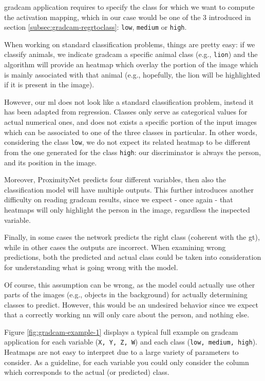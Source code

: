 \gls{gradcam} application requires to specify the class for which we want to compute the activation mapping, which in our case would be one of the 3 introduced in section \ref{subsec:gradcam-regrtoclass}: \texttt{low}, \texttt{medium} or \texttt{high}. 

When working on standard classification problems, things are pretty easy: if we classify animals, we indicate \gls{gradcam} a specific animal class (e.g., \texttt{lion}) and the algorithm will provide an heatmap which overlay the portion of the image which is mainly associated with that animal (e.g., hopefully, the lion will be highlighted if it is present in the image).

\medskip

However, our \gls{ml} does not look like a standard classification problem, instead it has been adapted from regression. Classes only serve as categorical values for actual numerical ones, and does not exists a specific portion of the input images which can be associated to one of the three classes in particular. In other words, considering the class \texttt{low}, we do not expect its related heatmap to be different from the one generated for the class \texttt{high}: our discriminator is always the person, and its position in the image.

Moreover, ProximityNet predicts four different variables, then also the classification model will have multiple outputs. This further introduces another difficulty on reading \gls{gradcam} results, since we expect - once again - that heatmaps will only highlight the person in the image, regardless the inspected variable.

Finally, in some cases the network predicts the right class (coherent with the \gls{gt}), while in other cases the outputs are incorrect. When examining wrong predictions, both the predicted and actual class could be taken into consideration for understanding what is going wrong with the model.

Of course, this assumption can be wrong, as the model could actually use other parts of the images (e.g., objects in the background) for actually determining classes to predict. However, this would be an undesired behavior since we expect that a correctly working \gls{nn} will only care about the person, and nothing else.

\bigskip

Figure \ref{fig:gradcam-example-1} displays a typical full example on \gls{gradcam} application for each variable (\texttt{X, Y, Z, W}) and each class (\texttt{low, medium, high}). Heatmaps are not easy to interpret due to a large variety of parameters to consider. As a guideline, for each variable you could only consider the column which corresponds to the actual (or predicted) class.

